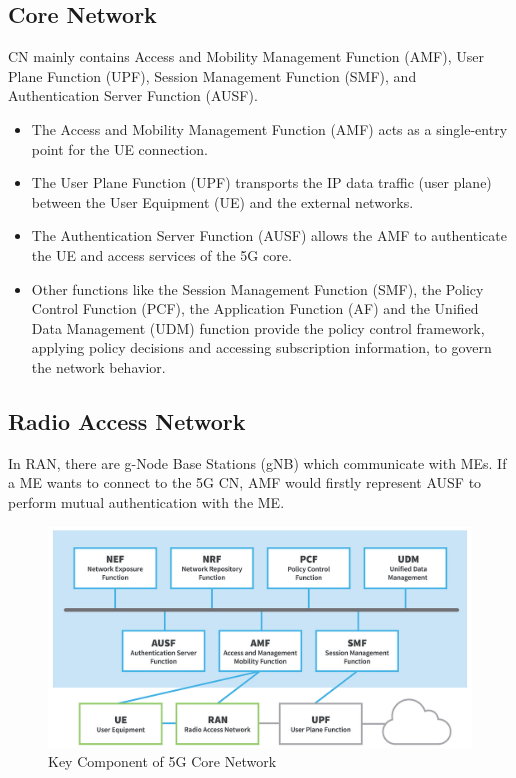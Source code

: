 {    \subsection{Core Network}
    {
        CN mainly contains Access and Mobility Management  Function (AMF), 
        User Plane Function (UPF), Session Management Function (SMF), and Authentication 
        Server Function (AUSF). 
        \begin{itemize}
            \item The Access and Mobility Management Function (AMF) acts as a single-entry point for the UE connection.
            \item The User Plane Function (UPF) transports the IP data traffic (user plane) between the User Equipment (UE) and the external networks.
            \item The Authentication Server Function (AUSF) allows the AMF to authenticate the UE and access services of the 5G core.
            \item Other functions like the Session Management Function (SMF), the Policy Control Function (PCF), the Application Function (AF) and the Unified Data Management (UDM) function provide the policy control framework, applying policy decisions and accessing subscription information, to govern the network behavior.
        \end{itemize}
    }


    \subsection{Radio Access Network}{
        In RAN, there are g-Node Base Stations (gNB) which
        communicate with MEs. If a ME wants to connect to the 5G
        CN, AMF would firstly represent AUSF to perform mutual
        authentication with the ME.
    }
    \begin{figure}[h]
        \centering
        \includegraphics[scale=0.6]{img/5g-rpc.jpg}
        \caption{Key Component of 5G Core Network}
    \end{figure}
}

